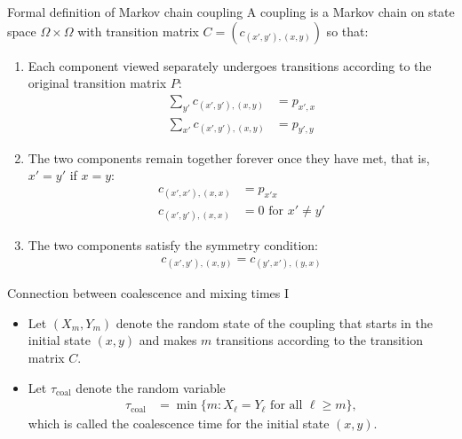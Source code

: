 \documentclass{beamer}
\renewcommand{\>}{\rangle}
\newcommand{\<}{\langle}
\begin{document}

\begin{frame}{Formal definition of Markov chain coupling}
A coupling is a Markov chain on state space $\Omega\times\Omega$ with transition matrix $C =(c_{(x',y'), (x,y)})$ so that:

\medskip
\begin{enumerate}
    \item Each component viewed separately undergoes transitions according to the original transition matrix $P$:
    \begin{align*}
        \sum_{y'} c_{(x',y'),(x,y)} 
        &= 
        p_{x',x} \\
        \sum_{x'} c_{(x',y'),(x,y)} 
        &= 
        p_{y',y}
    \end{align*}
    \item The two components remain together forever once they have met, that is, $x'=y'$ if $x=y$:
    \begin{align*}
        c_{(x',x'),(x,x)}
        &=
        p_{x'x} \\
        c_{(x',y'),(x,x)} 
        &=
        0 \mbox{ for } x'\neq y'
    \end{align*}
    \item The two components satisfy the symmetry condition:
    \begin{align*}
        c_{(x',y'),(x,y)} =
        c_{(y',x'),(y,x)}
    \end{align*}
\end{enumerate}
\end{frame}


\begin{frame}{Connection between coalescence and mixing times I}

\begin{itemize}
\item Let $(X_m,Y_m)$ denote the random state of the coupling that starts in the initial state $(x,y)$ and makes $m$ transitions according to the transition matrix $C$. 

\bigskip
\item Let $\tau_\mathrm{coal}$ denote the random variable  
\begin{align*}
    \tau_\mathrm{coal} 
    &=
    \min\{ m : X_\ell = Y_\ell \mbox{ for all } \ell \ge m\},
\end{align*}
which is called the coalescence time for the initial state $(x,y)$.
\end{itemize}
\end{frame}
\end{document}

